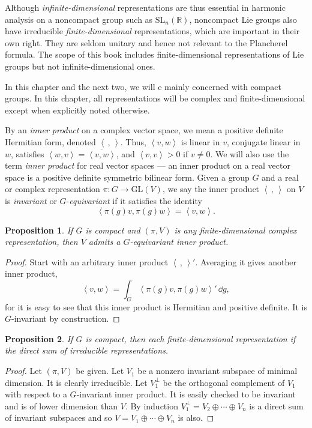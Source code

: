 \documentclass[12pt,reqno]{book}%
\newtheorem{proposition}{Proposition}[chapter]
\theoremstyle{definition}
\theoremstyle{remark}
\theoremstyle{theorem}
\theoremstyle{remark}
\renewcommand{\d}{\dd}
\begin{document}
Although \emph{infinite-dimensional} representations are thus essential in harmonic analysis on a noncompact group such as $\mathrm{SL}_{n}(\mathbb{R})$, noncompact Lie groups also have irreducible \emph{finite-dimensional} representations, which are important in their own right.
They are seldom unitary and hence not relevant to the Plancherel formula.
The scope of this book includes finite-dimensional representations of Lie groups but not infinite-dimensional ones.

In this chapter and the next two, we will e mainly concerned with compact groups.
In this chapter, all representations will be complex and finite-dimensional except when explicitly noted otherwise.

By an \emph{inner product} on a complex vector space, we mean a positive definite Hermitian form, denoted ${\left\langle \, , \, \right\rangle}$.
Thus, ${\left\langle v, w\right\rangle}$ is linear in $v$, conjugate linear in $w$, satisfies ${\left\langle w, v\right\rangle} = \overline{\left\langle v, w\right\rangle}$, and ${\left\langle v, v\right\rangle} > 0$ if $v \neq 0$.
We will also use the term \emph{inner product} for real vector spaces --- an inner product on a real vector space is a positive definite symmetric bilinear form.
Given a group $G$ and a real or complex representation $\pi : G \to \mathrm{GL}(V)$, we say the inner product ${\left\langle \, , \, \right\rangle}$ on $V$ is \emph{invariant} or $G$-\emph{equivariant} if it satisfies the identity
\[
    {\left\langle \pi(g) v, \pi(g) w\right\rangle} = {\left\langle v, w\right\rangle}.
\]

\begin{proposition}\label{}%
    If $G$ is compact and $(\pi, V)$ is any finite-dimensional complex representation, then $V$ admits a $G$-equivariant inner product.
\end{proposition}%
\begin{proof}%
    Start with an arbitrary inner product ${\left\langle \, , \, \right\rangle}'$.
    Averaging it gives another inner product,
    \[
        {\left\langle v, w\right\rangle} = \int_{G} {\left\langle \pi(g) v, \pi(g) w\right\rangle}' \, \d g,
    \]
    for it is easy to see that this inner product is Hermitian and positive definite.
    It is $G$-invariant by construction.
\end{proof}%

\begin{proposition}\label{}%
    If $G$ is compact, then each finite-dimensional representation if the direct sum of irreducible representations.
\end{proposition}%
\begin{proof}%
    Let $(\pi, V)$ be given.
    Let $V_1$ be a nonzero invariant subspace of minimal dimension.
    It is clearly irreducible.
    Let $V_1^\perp$ be the orthogonal complement of $V_1$ with respect to a $G$-invariant inner product.
    It is easily checked to be invariant and is of lower dimension than $V$.
    By induction $V_1^\perp = V_2 \oplus \cdots \oplus V_n$ is a direct sum of invariant subspaces and so $V = V_1 \oplus \cdots \oplus V_n$ is also.
\end{proof}%
\end{document}
